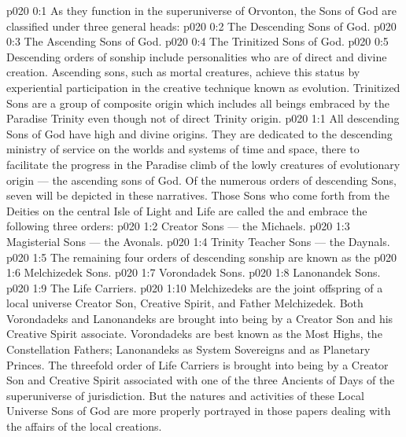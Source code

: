 \author{Perfector of Wisdom}
\vs p020 0:1 As they function in the superuniverse of Orvonton, the Sons of God are classified under three general heads:
\vs p020 0:2 \bibnobreakspace The Descending Sons of God.
\vs p020 0:3 \bibnobreakspace The Ascending Sons of God.
\vs p020 0:4 \bibnobreakspace The Trinitized Sons of God.
\vs p020 0:5 \pc Descending orders of sonship include personalities who are of direct and divine creation. Ascending sons, such as mortal creatures, achieve this status by experiential participation in the creative technique known as evolution. Trinitized Sons are a group of composite origin which includes all beings embraced by the Paradise Trinity even though not of direct Trinity origin.
\vs p020 1:1 All descending Sons of God have high and divine origins. They are dedicated to the descending ministry of service on the worlds and systems of time and space, there to facilitate the progress in the Paradise climb of the lowly creatures of evolutionary origin --- the ascending sons of God. Of the numerous orders of descending Sons, seven will be depicted in these narratives. Those Sons who come forth from the Deities on the central Isle of Light and Life are called the  and embrace the following three orders:
\vs p020 1:2 \bibnobreakspace Creator Sons --- the Michaels.
\vs p020 1:3 \bibnobreakspace Magisterial Sons --- the Avonals.
\vs p020 1:4 \bibnobreakspace Trinity Teacher Sons --- the Daynals.
\vs p020 1:5 \pc The remaining four orders of descending sonship are known as the 
\vs p020 1:6 \bibnobreakspace Melchizedek Sons.
\vs p020 1:7 \bibnobreakspace Vorondadek Sons.
\vs p020 1:8 \bibnobreakspace Lanonandek Sons.
\vs p020 1:9 \bibnobreakspace The Life Carriers.
\vs p020 1:10 \pc Melchizedeks are the joint offspring of a local universe Creator Son, Creative Spirit, and Father Melchizedek. Both Vorondadeks and Lanonandeks are brought into being by a Creator Son and his Creative Spirit associate. Vorondadeks are best known as the Most Highs, the Constellation Fathers; Lanonandeks as System Sovereigns and as Planetary Princes. The threefold order of Life Carriers is brought into being by a Creator Son and Creative Spirit associated with one of the three Ancients of Days of the superuniverse of jurisdiction. But the natures and activities of these Local Universe Sons of God are more properly portrayed in those papers dealing with the affairs of the local creations.
